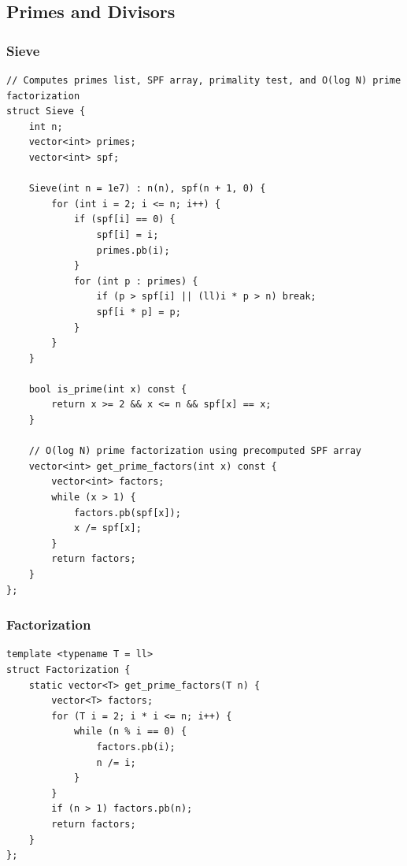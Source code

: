 \documentclass[9pt,a4paper,twocolumn]{extarticle}
\begin{document}
\subsection{Primes and Divisors}

\filbreak
\subsubsection{Sieve}
\nopagebreak
\begin{lstlisting}
// Computes primes list, SPF array, primality test, and O(log N) prime factorization
struct Sieve {
    int n;
    vector<int> primes;
    vector<int> spf;

    Sieve(int n = 1e7) : n(n), spf(n + 1, 0) {
        for (int i = 2; i <= n; i++) {
            if (spf[i] == 0) {
                spf[i] = i;
                primes.pb(i);
            }
            for (int p : primes) {
                if (p > spf[i] || (ll)i * p > n) break;
                spf[i * p] = p;
            }
        }
    }

    bool is_prime(int x) const {
        return x >= 2 && x <= n && spf[x] == x;
    }

    // O(log N) prime factorization using precomputed SPF array
    vector<int> get_prime_factors(int x) const {
        vector<int> factors;
        while (x > 1) {
            factors.pb(spf[x]);
            x /= spf[x];
        }
        return factors;
    }
};
\end{lstlisting}

\filbreak
\subsubsection{Factorization}
\nopagebreak
\begin{lstlisting}
template <typename T = ll>
struct Factorization {
    static vector<T> get_prime_factors(T n) {
        vector<T> factors;
        for (T i = 2; i * i <= n; i++) {
            while (n % i == 0) {
                factors.pb(i);
                n /= i;
            }
        }
        if (n > 1) factors.pb(n);
        return factors;
    }
};
\end{lstlisting}
\end{document}

